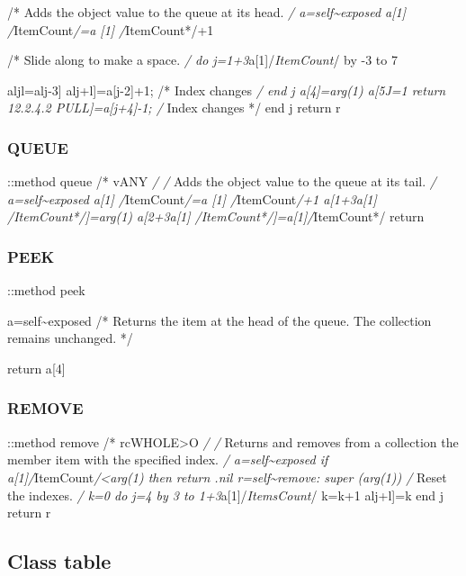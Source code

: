/* Adds the object value to the queue at its head. \emph{/
a=self\textasciitilde exposed a{[}1{]} /}ItemCount\emph{/=a {[}1{]}
/}ItemCount*/+1

/* Slide along to make a space. \emph{/ do
j=1+3}a{[}1{]}/\emph{ItemCount}/ by -3 to 7

aljl=alj-3{]} alj+l{]}=a{[}j-2{]}+1; /* Index changes \emph{/ end j
a{[}4{]}=arg(1) a{[}5J=1 return 12.2.4.2 PULL{]}=a{[}j+4{]}-1; /} Index
changes */ end j return r

\hypertarget{queue}{%
\subsubsection{QUEUE}\label{queue}}

::method queue /* vANY \emph{/ /} Adds the object value to the queue at
its tail. \emph{/ a=self\textasciitilde exposed a{[}1{]}
/}ItemCount\emph{/=a {[}1{]} /}ItemCount\emph{/+1 a{[}1+3\emph{a{[}1{]}
/}ItemCount*/{]}=arg(1) a{[}2+3\emph{a{[}1{]}
/}ItemCount*/{]}=a{[}1{]}/}ItemCount*/ return

\hypertarget{peek}{%
\subsubsection{PEEK}\label{peek}}

::method peek

a=self\textasciitilde exposed /* Returns the item at the head of the
queue. The collection remains unchanged. */

return a{[}4{]}

\hypertarget{remove-1}{%
\subsubsection{REMOVE}\label{remove-1}}

::method remove /* rcWHOLE\textgreater O \emph{/ /} Returns and removes
from a collection the member item with the specified index. \emph{/
a=self\textasciitilde exposed if
a{[}1{]}/}ItemCount\emph{/\textless arg(1) then return .nil
r=self\textasciitilde remove: super (arg(1)) /} Reset the indexes.
\emph{/ k=0 do j=4 by 3 to 1+3}a{[}1{]}/\emph{ItemsCount}/ k=k+1
alj+l{]}=k end j return r

\hypertarget{class-table}{%
\subsection{Class table}\label{class-table}}

